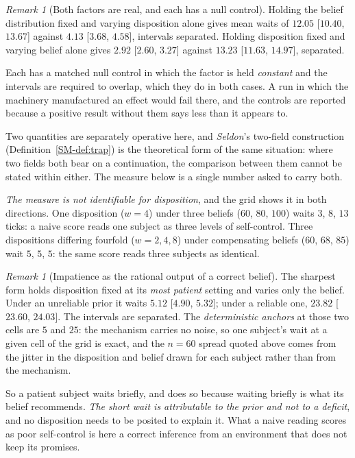 \documentclass[11pt,a4paper]{article}
\theoremstyle{remark}
\newtheorem{remark}[definition]{Remark}
\begin{document}
\begin{remark}[Both factors are real, and each has a null control]\label{rem:dissolution}
Holding the belief distribution fixed and varying disposition alone gives mean waits of $12.05$
[$10.40$, $13.67$] against $4.13$ [$3.68$, $4.58$], intervals separated. Holding disposition fixed
and varying belief alone gives $2.92$ [$2.60$, $3.27$] against $13.23$ [$11.63$, $14.97$], separated.

Each has a matched null control in which the factor is held \emph{constant} and the intervals are
required to overlap, which they do in both cases. A run in which the machinery manufactured an
effect would fail there, and the controls are reported because a positive result without them says
less than it appears to.

Two quantities are separately operative here, and \emph{Seldon}'s two-field construction
(Definition~\ref{SM-def:trap}) is the theoretical form of the same situation: where two fields both
bear on a continuation, the comparison between them cannot be stated within either. The measure
below is a single number asked to carry both.
\end{remark}

\emph{The measure is not identifiable for disposition}, and the grid shows it in both directions.
One disposition ($w=4$) under three beliefs ($60$, $80$, $100$) waits $3$, $8$, $13$ ticks: a naive
score reads one subject as three levels of self-control. Three dispositions differing fourfold
($w=2,4,8$) under compensating beliefs ($60$, $68$, $85$) wait $5$, $5$, $5$: the same score reads
three subjects as identical.

\begin{remark}[Impatience as the rational output of a correct belief]\label{rem:rational-impatience}
The sharpest form holds disposition fixed at its \emph{most patient} setting and varies only the
belief. Under an unreliable prior it waits $5.12$ [$4.90$, $5.32$]; under a reliable one, $23.82$
[$23.60$, $24.03$]. The intervals are separated. The \emph{deterministic anchors} at those two cells are $5$ and
$25$: the mechanism carries no noise, so one subject's wait at a given cell of the grid is exact,
and the $n=60$ spread quoted above comes from the jitter in the disposition and belief drawn for
each subject rather than from the mechanism.

So a patient subject waits briefly, and does so because waiting briefly is what its belief
recommends. \emph{The short wait is attributable to the prior and not to a deficit}, and no
disposition needs to be posited to explain it. What a naive reading scores as poor self-control is
here a correct inference from an environment that does not keep its promises.
\end{remark}
\end{document}
